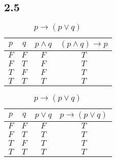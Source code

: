 \documentclass[10pt]{ctexart}
\begin{document}
    \subsection*{2.5}
        \begin{table}[h]
            \centering
            \renewcommand{\thesubtable}{\alph{subtable}}
            \begin{subtable}[h]{2in}
                \setlength{\abovecaptionskip}{0pt}
                \setlength{\belowcaptionskip}{0pt}
                \centering
                \caption{$(p \wedge q) \rightarrow p$}
                \begin{tabular}{|c|c|c|c|}
                    \hline
                    $p$ & $q$ & $p \wedge q$ & $(p \wedge q) \rightarrow p$ \\ 
                    \hline
                    $F$ & $F$ & $F$ & $T$ \\ 
                    \hline
                    $F$ & $T$ & $F$ & $T$ \\ 
                    \hline
                    $T$ & $F$ & $F$ & $T$ \\ 
                    \hline
                    $T$ & $T$ & $T$ & $T$ \\ 
                    \hline
                \end{tabular}
            \end{subtable}
            \begin{subtable}[h]{3in}
                \setlength{\abovecaptionskip}{0pt}
                \setlength{\belowcaptionskip}{0pt}
                \centering
                \caption{$p \rightarrow (p \vee q)$}
                \begin{tabular}{|c|c|c|c|}
                    \hline
                    $p$ & $q$ & $p \vee q$ & $p \rightarrow (p \vee q)$ \\
                    \hline
                    $F$ & $F$ & $F$ & $T$ \\ 
                    \hline
                    $F$ & $T$ & $T$ & $T$ \\ 
                    \hline
                    $T$ & $F$ & $T$ & $T$ \\ 
                    \hline
                    $T$ & $T$ & $T$ & $T$ \\ 
                    \hline
                \end{tabular}
            \end{subtable}
            \begin{subtable}[h]{2in}

\end{subtable}
\end{table}
\end{document}
